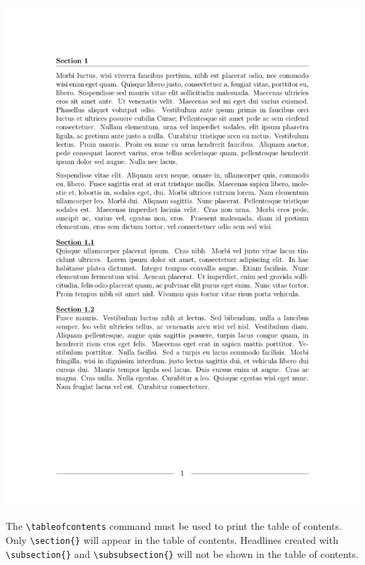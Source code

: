 \begin{myFIG}{}
	\includegraphics[page=2,scale=0.22]{examples/zz_bsp_file_Headlines.pdf}
\end{myFIG}

\justifying

The \Verb|\tableofcontents| command must be used to print the table of contents. Only \Verb|\section{}| will appear in the table of contents. Headlines created with \Verb|\subsection{}| and \Verb|\subsubsection{}| will not be shown in the table of contents. 

